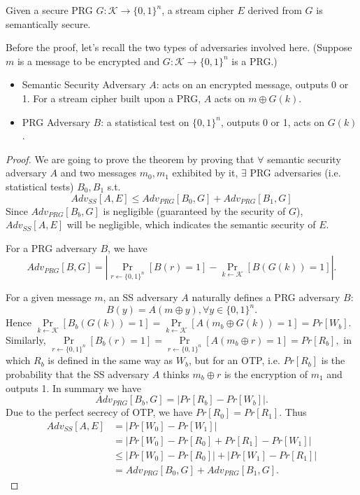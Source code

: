 \begin{theorem}
Given a secure PRG $G:\mathcal{K}\rightarrow\{0,1\}^n$, a stream cipher $E$ derived from $G$ is semantically secure. 
\end{theorem} 
Before the proof, let's recall the two types of adversaries involved here. (Suppose $m$ is a message to be encrypted and $G:\mathcal{K}\rightarrow \{0,1\}^n$ is a PRG.)
\begin{itemize}
\item Semantic Security Adversary $A$: acts on an encrypted message, outputs 0 or 1. For a stream cipher built upon a PRG,  $A$ acts on $m\oplus G(k)$.
\item PRG Adversary $B$: a statistical test on $\{0,1\}^n$, outputs 0 or 1, acts on $G(k)$.
\end{itemize}
\begin{proof}
We are going to prove the theorem by proving that $\forall$ semantic security adversary $A$ and two messages $m_0, m_1$ exhibited by it, $\exists$ PRG adversaries (i.e. statistical tests) $B_0,B_1$ s.t.
\[Adv_{SS}[A,E]\leq Adv_{PRG}[B_0,G]+Adv_{PRG}[B_1,G]\]
Since $Adv_{PRG}[B_b,G]$ is negligible (guaranteed by the security of $G$), $Adv_{SS}[A,E]$ will be negligible, which indicates the semantic security of $E$. 

For a PRG adversary $B$, we have 
\[Adv_{PRG}[B,G]=\left\lvert\mathop{Pr}\limits_{r\leftarrow\{0,1\}^n}[B(r)=1]-\mathop{Pr}\limits_{k\leftarrow\mathcal{K}}[B(G(k))=1]\right\rvert.\]

For a given message $m$, an SS adversary $A$ naturally defines a PRG adversary $B$:
\[B(y)=A(m\oplus y), \forall y\in\{0,1\}^n.\]
Hence $\mathop{Pr}\limits_{k\leftarrow\mathcal{K}}[B_b(G(k))=1]=\mathop{Pr}\limits_{k\leftarrow\mathcal{K}}[A(m_b\oplus G(k))=1]=Pr[W_b].$ Similarly, $\mathop{Pr}\limits_{r\leftarrow\{0,1\}^n}[B_b(r)=1]=\mathop{Pr}\limits_{r\leftarrow\{0,1\}^n}[A(m_b\oplus r)=1]=Pr[R_b],$ in which $R_b$ is defined in the same way as $W_b$, but for an OTP, i.e. $Pr[R_b]$ is the probability that the SS adversary $A$ thinks $m_b\oplus r$ is the encryption of $m_1$ and outputs 1. In summary we have 
\[Adv_{PRG}[B_b,G]=\left\lvert Pr[R_b]-Pr[W_b]\right\rvert.\]
Due to the perfect secrecy of OTP, we have $Pr[R_0]=Pr[R_1]$. Thus
\begin{align*}
Adv_{SS}[A,E]&=\left\lvert Pr[W_0]-Pr[W_1]\right\rvert\\
&=\left\lvert Pr[W_0]-Pr[R_0]+Pr[R_1]-Pr[W_1]\right\rvert\\
&\leq\left\lvert Pr[W_0]-Pr[R_0]\right\rvert+\left\lvert Pr[W_1]-Pr[R_1]\right\rvert\\
&=Adv_{PRG}[B_0,G]+Adv_{PRG}[B_1,G].
\end{align*}
\end{proof}
\ifx\PREAMBLE\undefined

\fi
